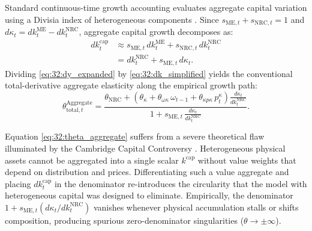 Standard continuous-time growth accounting evaluates aggregate capital variation using a Divisia index of heterogeneous components \citep{Divisia1925}. Since $s_{\text{ME},t} + s_{\text{NRC},t} = 1$ and $d\kappa_t = dk^{\text{ME}}_t - dk^{\text{NRC}}_t$, aggregate capital growth decomposes as:
\begin{align}
	dk^{\text{cap}}_t &\approx s_{\text{ME},t}\, dk^{\text{ME}}_t
	+ s_{\text{NRC},t}\, dk^{\text{NRC}}_t
	\label{eq:32:dk_divisia} \\
	&= dk^{\text{NRC}}_t + s_{\text{ME},t}\, d\kappa_t.
	\label{eq:32:dk_simplified}
\end{align}
Dividing \eqref{eq:32:dy_expanded} by \eqref{eq:32:dk_simplified} yields the conventional total-derivative aggregate elasticity along the empirical growth path:
\begin{equation}
	\theta^{\text{Aggregate}}_{\text{total},t}
	= \frac{\theta_{\text{NRC}}
		+ \left(\theta_\kappa + \theta_{\omega\kappa}\, \omega_{t-1}
		+ \theta_{\kappa p\kappa}\, p^\kappa_t\right)
		\frac{d\kappa_t}{dk^{\text{NRC}}_t}}
	{1 + s_{\text{ME},t}\, \frac{d\kappa_t}{dk^{\text{NRC}}_t}}.
	\label{eq:32:theta_aggregate}
\end{equation}

Equation \eqref{eq:32:theta_aggregate} suffers from a severe theoretical flaw illuminated by the Cambridge Capital Controversy \citep{Robinson1953,Sraffa1960}. Heterogeneous physical assets cannot be aggregated into a single scalar $k^{\text{cap}}$ without value weights that depend on distribution and prices. Differentiating such a value aggregate and placing $dk^{\text{cap}}_t$ in the denominator re-introduces the circularity that the model with heterogeneous capital was designed to eliminate. Empirically, the denominator $1 + s_{\text{ME},t}(d\kappa_t / dk^{\text{NRC}}_t)$ vanishes whenever physical accumulation stalls or shifts composition, producing spurious zero-denominator singularities ($\theta \to \pm\infty$).

